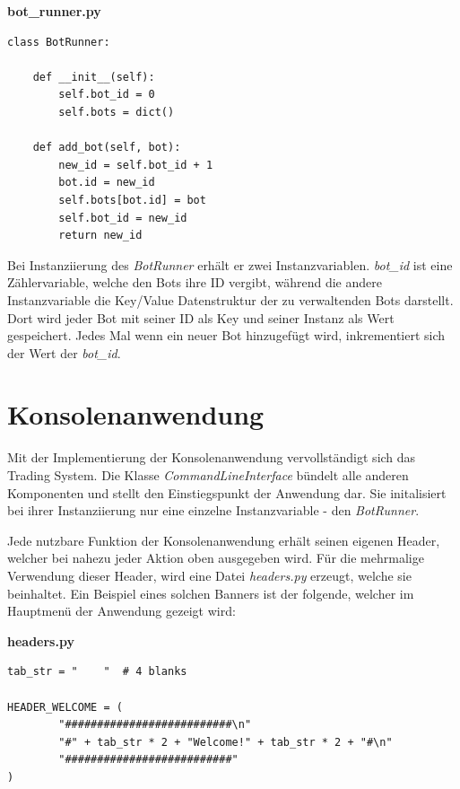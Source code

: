 \documentclass[oneside]{ausarbeitung}
\begin{document}
\lstset{language=Python}
\lstset{frame=lines}
\lstset{basicstyle=\footnotesize}
\textbf{bot\_runner.py}
\begin{lstlisting}
class BotRunner:

	def __init__(self):
		self.bot_id = 0
		self.bots = dict()

	def add_bot(self, bot):
		new_id = self.bot_id + 1
		bot.id = new_id
		self.bots[bot.id] = bot
		self.bot_id = new_id
		return new_id
\end{lstlisting}

Bei Instanziierung des \textit{BotRunner} erhält er zwei Instanzvariablen. \textit{bot\_id} ist eine Zählervariable, welche den Bots ihre ID vergibt, während die andere Instanzvariable die Key/Value Datenstruktur der zu verwaltenden Bots darstellt. Dort wird jeder Bot mit seiner ID als Key und seiner Instanz als Wert gespeichert. Jedes Mal wenn ein neuer Bot hinzugefügt wird, inkrementiert sich der Wert der \textit{bot\_id}.


\section{Konsolenanwendung}
\label{sec:konsolenanwendung}

Mit der Implementierung der Konsolenanwendung vervollständigt sich das Trading System. Die Klasse \textit{CommandLineInterface} bündelt alle anderen Komponenten und stellt den Einstiegspunkt der Anwendung dar. Sie initalisiert bei ihrer Instanziierung nur eine einzelne Instanzvariable - den \textit{BotRunner}.

Jede nutzbare Funktion der Konsolenanwendung erhält seinen eigenen Header, welcher bei nahezu jeder Aktion oben ausgegeben wird. Für die mehrmalige Verwendung dieser Header, wird eine Datei \textit{headers.py} erzeugt, welche sie beinhaltet. Ein Beispiel eines solchen Banners ist der folgende, welcher im Hauptmenü der Anwendung gezeigt wird:

\lstset{language=Python}
\lstset{frame=lines}
\lstset{basicstyle=\footnotesize}
\textbf{headers.py}
\begin{lstlisting}
tab_str = "    "  # 4 blanks

HEADER_WELCOME = (
        "##########################\n"
        "#" + tab_str * 2 + "Welcome!" + tab_str * 2 + "#\n"
        "##########################"
)
\end{lstlisting}
\end{document}

